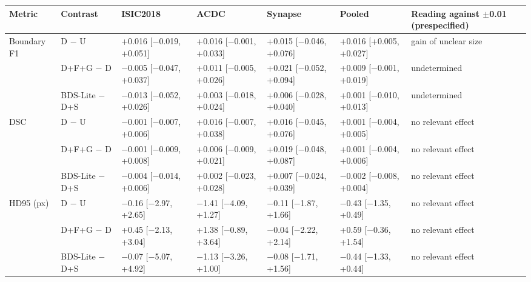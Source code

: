\begin{tabular}{lllllll}
\toprule
Metric & Contrast & ISIC2018 & ACDC & Synapse & Pooled & Reading against $\pm$0.01 (prespecified) \\
\midrule
Boundary F1 & D $-$ U & +0.016 [$-$0.019, +0.051] & +0.016 [$-$0.001, +0.033] & +0.015 [$-$0.046, +0.076] & +0.016 [+0.005, +0.027] & gain of unclear size \\
 & D+F+G $-$ D & $-$0.005 [$-$0.047, +0.037] & +0.011 [$-$0.005, +0.026] & +0.021 [$-$0.052, +0.094] & +0.009 [$-$0.001, +0.019] & undetermined \\
 & BDS-Lite $-$ D+S & $-$0.013 [$-$0.052, +0.026] & +0.003 [$-$0.018, +0.024] & +0.006 [$-$0.028, +0.040] & +0.001 [$-$0.010, +0.013] & undetermined \\
\midrule
DSC & D $-$ U & $-$0.001 [$-$0.007, +0.006] & +0.016 [$-$0.007, +0.038] & +0.016 [$-$0.045, +0.076] & +0.001 [$-$0.004, +0.005] & no relevant effect \\
 & D+F+G $-$ D & $-$0.001 [$-$0.009, +0.008] & +0.006 [$-$0.009, +0.021] & +0.019 [$-$0.048, +0.087] & +0.001 [$-$0.004, +0.006] & no relevant effect \\
 & BDS-Lite $-$ D+S & $-$0.004 [$-$0.014, +0.006] & +0.002 [$-$0.023, +0.028] & +0.007 [$-$0.024, +0.039] & $-$0.002 [$-$0.008, +0.004] & no relevant effect \\
\midrule
HD95 (px) & D $-$ U & $-$0.16 [$-$2.97, +2.65] & $-$1.41 [$-$4.09, +1.27] & $-$0.11 [$-$1.87, +1.66] & $-$0.43 [$-$1.35, +0.49] & no relevant effect \\
 & D+F+G $-$ D & +0.45 [$-$2.13, +3.04] & +1.38 [$-$0.89, +3.64] & $-$0.04 [$-$2.22, +2.14] & +0.59 [$-$0.36, +1.54] & no relevant effect \\
 & BDS-Lite $-$ D+S & $-$0.07 [$-$5.07, +4.92] & $-$1.13 [$-$3.26, +1.00] & $-$0.08 [$-$1.71, +1.56] & $-$0.44 [$-$1.33, +0.44] & no relevant effect \\
\bottomrule
\end{tabular}
